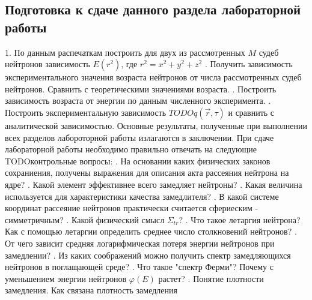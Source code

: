 \documentclass[a4paper]{article}
\begin{document}
    \subsection{Подготовка к сдаче данного раздела лабораторной работы}
    1. По данным распечаткам построить для двух из рассмотренных $M$
    судеб нейтронов зависимость $E(r^2)$, где \(r^2 = x^2 + y^2 + z^2\)
    . Получить зависимость экспериментального значения возраста
    нейтронов от числа рассмотренных судеб нейтронов. Сравнить с
    теоретическими значениями возраста.
    . Построить зависимость возраста от энергии по данным численного
    эксперимента.
    . Построить экспериментальную зависимость $TODO{q}(\vec{r},\tau)$
    и сравнить с аналитической зависимостью. 
    \newline
    Основные результаты, полученные при выполнении всех разделов
    лабороторной работы излагаются в заключении.
    \newline
    При сдаче лабораторной работы необходимо правильно отвечать на
    следующие TODO{контрольные вопросы}:
    . На основании каких физических законов сохраниения, получены
    выражения для описания акта рассеяния нейтрона на ядре?
    . Какой элемент эффективнее всего замедляет нейтроны?
    . Какая величина используется для характеристики качества
    замедлителя?
    . В какой системе координат рассеяние нейтронов практически
    считается сфериеским - симметричным?
    . Какой физический смысл $\Sigma_{tr}$?
    . Что такое летаргия нейтрона? Как с помощью летаргии определить
    среднее число столкновений нейтронов?
    . От чего зависит средняя логарифмическая потеря энергии
    нейтронов при замедлении?
    . Из каких соображений можно получить спектр замедляющихся
    нейтронов в поглащающей среде?
    . Что такое "спектр Ферми"? Почему с уменьшением энергии
    нейтронов $\varphi(E)$ растет?
    . Понятие плотности замедления. Как связана плотность замедления
\end{document}
